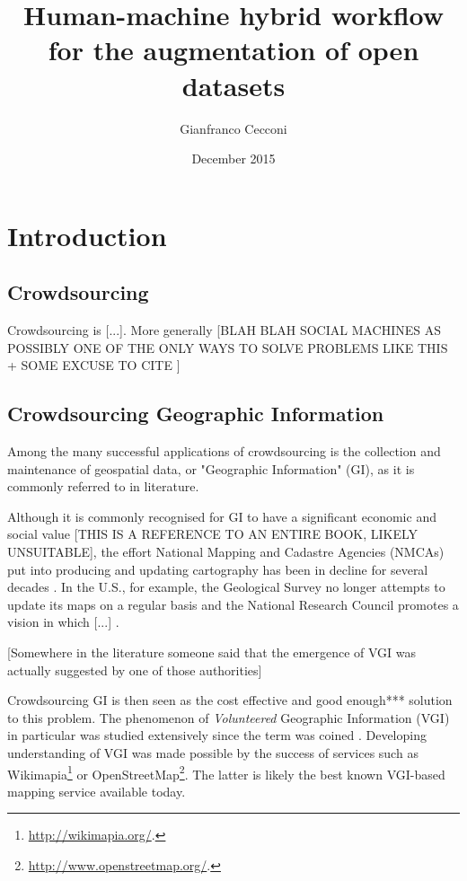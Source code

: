 \documentclass{llncs}
\title{Human-machine hybrid workflow for the augmentation of open datasets}
\author{Gianfranco Cecconi}
\institute{University of Southampton \email{gc1a13@soton.ac.uk}}
\date{December 2015}
\begin{document}
\maketitle

\section{Introduction}

\subsection{Crowdsourcing}

Crowdsourcing is {[}...{]}. More generally {[}BLAH BLAH SOCIAL MACHINES AS POSSIBLY ONE OF THE ONLY WAYS TO SOLVE PROBLEMS LIKE THIS + SOME EXCUSE TO CITE \cite{OReilly:2015uo}{]}

\subsection{Crowdsourcing Geographic Information}

Among the many successful applications of crowdsourcing is the collection and maintenance of geospatial data, or "Geographic Information" (GI), as it is commonly referred to in literature.

Although it is commonly recognised for GI to have a significant economic and social value \cite{Sui:2012uf}[THIS IS A REFERENCE TO AN ENTIRE BOOK, LIKELY UNSUITABLE], the effort National Mapping and Cadastre Agencies (NMCAs) put into producing and updating cartography has been in decline for several decades \cite{ESTES:1994vz}. In the U.S., for example, the Geological Survey no longer attempts to update its maps on a regular basis and the National Research Council promotes a vision in which {[}...{]} \cite{Committee:1993vp}.

{[}Somewhere in the literature someone said that the emergence of VGI was actually suggested by one of those authorities{]}

Crowdsourcing GI is then seen as the cost effective and good enough*** solution to this problem. The phenomenon of {\it Volunteered} Geographic Information (VGI) in particular was studied extensively since the term was coined \cite{Goodchild:2007vt}. Developing understanding of VGI was made possible by the success of services such as Wikimapia\footnote{\url{http://wikimapia.org/}.} or OpenStreetMap\footnote{\url{http://www.openstreetmap.org/}.}. The latter is likely the best known VGI-based mapping service available today.
\end{document}

